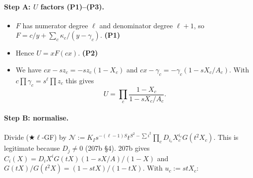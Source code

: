 \documentclass[11pt]{amsart}
\theoremstyle{remark}
\newcommand{\cN}{\mathcal{N}}
\newcommand{\plab}[1]{\textbf{(#1)}}
\begin{document}
\paragraph{Step A: $U$ factors \plab{P1}--\plab{P3}.}
\begin{itemize}
\item $F$ has numerator degree $\ell$ and denominator degree $\ell+1$, so $F=c/y+\sum_c\kappa_c/(y-\gamma_c)$. \hfill\plab{P1}
\item Hence $U=xF(cx)$. \hfill\plab{P2}
\item We have $cx-sz_c=-sz_c(1-X_c)$ and $cx-\gamma_c=-\gamma_c(1-sX_c/A_c)$. With $c\prod\gamma_c=s^\ell\prod z_c$ this gives
\[
U=\prod_c\frac{1-X_c}{1-sX_c/A_c}.\tag{P3}
\]
\end{itemize}

\paragraph{Step B: normalise.} Divide ($\bigstar\ell$-GF) by $\cN:=K_Is^{-(\ell-1)S}t^{S^2-\sum i^2}\prod_cD_{i_c}X_c^{i_c}G(t^2X_c)$. This is legitimate because $D_j\ne0$ (207b \S4). 207b gives $C_i(X)=D_iX^iG(tX)(1-sX/A)/(1-X)$ and $G(tX)/G(t^2X)=(1-stX)/(1-tX)$. With $u_c:=stX_c$:
\end{document}
